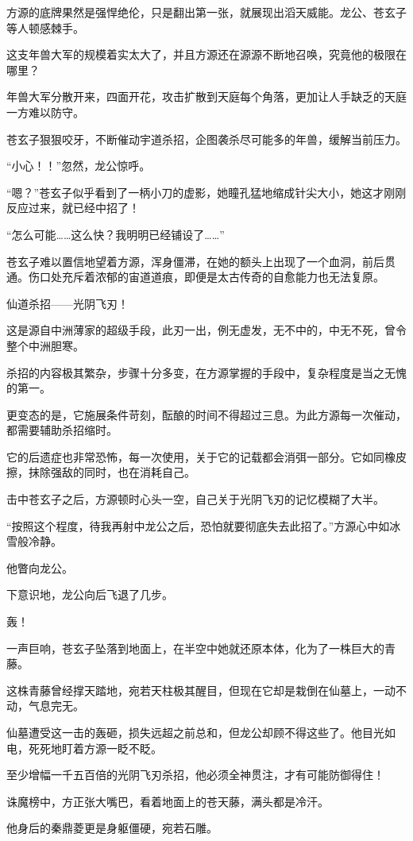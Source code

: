 \begin{this_body}
方源的底牌果然是强悍绝伦，只是翻出第一张，就展现出滔天威能。龙公、苍玄子等人顿感棘手。

这支年兽大军的规模着实太大了，并且方源还在源源不断地召唤，究竟他的极限在哪里？

年兽大军分散开来，四面开花，攻击扩散到天庭每个角落，更加让人手缺乏的天庭一方难以防守。

苍玄子狠狠咬牙，不断催动宇道杀招，企图袭杀尽可能多的年兽，缓解当前压力。

“小心！！”忽然，龙公惊呼。

“嗯？”苍玄子似乎看到了一柄小刀的虚影，她瞳孔猛地缩成针尖大小，她这才刚刚反应过来，就已经中招了！

“怎么可能……这么快？我明明已经铺设了……”

苍玄子难以置信地望着方源，浑身僵滞，在她的额头上出现了一个血洞，前后贯通。伤口处充斥着浓郁的宙道道痕，即便是太古传奇的自愈能力也无法复原。

仙道杀招——光阴飞刃！

这是源自中洲薄家的超级手段，此刃一出，例无虚发，无不中的，中无不死，曾令整个中洲胆寒。

杀招的内容极其繁杂，步骤十分多变，在方源掌握的手段中，复杂程度是当之无愧的第一。

更变态的是，它施展条件苛刻，酝酿的时间不得超过三息。为此方源每一次催动，都需要辅助杀招缩时。

它的后遗症也非常恐怖，每一次使用，关于它的记载都会消弭一部分。它如同橡皮擦，抹除强敌的同时，也在消耗自己。

击中苍玄子之后，方源顿时心头一空，自己关于光阴飞刃的记忆模糊了大半。

“按照这个程度，待我再射中龙公之后，恐怕就要彻底失去此招了。”方源心中如冰雪般冷静。

他瞥向龙公。

下意识地，龙公向后飞退了几步。

轰！

一声巨响，苍玄子坠落到地面上，在半空中她就还原本体，化为了一株巨大的青藤。

这株青藤曾经撑天踏地，宛若天柱极其醒目，但现在它却是栽倒在仙墓上，一动不动，气息完无。

仙墓遭受这一击的轰砸，损失远超之前总和，但龙公却顾不得这些了。他目光如电，死死地盯着方源一眨不眨。

至少增幅一千五百倍的光阴飞刃杀招，他必须全神贯注，才有可能防御得住！

诛魔榜中，方正张大嘴巴，看着地面上的苍天藤，满头都是冷汗。

他身后的秦鼎菱更是身躯僵硬，宛若石雕。


\end{this_body}
